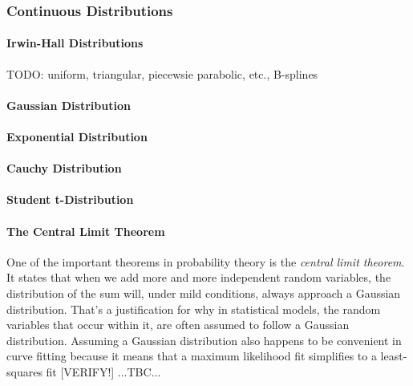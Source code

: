 \subsubsection{Continuous Distributions}

\paragraph{Irwin-Hall Distributions} TODO: uniform, triangular, piecewsie parabolic, etc., B-splines

\paragraph{Gaussian Distribution}

\paragraph{Exponential Distribution}

\paragraph{Cauchy Distribution}

\paragraph{Student t-Distribution}


\paragraph{The Central Limit Theorem}
One of the important theorems in probability theory is the \emph{central limit theorem}. It states that when we add more and more independent random variables, the distribution of the sum will, under mild conditions, always approach a Gaussian distribution. That's a justification for why in statistical models, the random variables that occur within it, are often assumed to follow a Gaussian distribution. Assuming a Gaussian distribution also happens to be convenient in curve fitting because it means that a maximum likelihood fit simplifies to a least-squares fit [VERIFY!] ...TBC...





\begin{comment}

Probability is just...really weird
https://www.youtube.com/watch?v=zczGnnM05TQ

- Probability distiributions
  Discrete
  Continuous

\end{comment}

